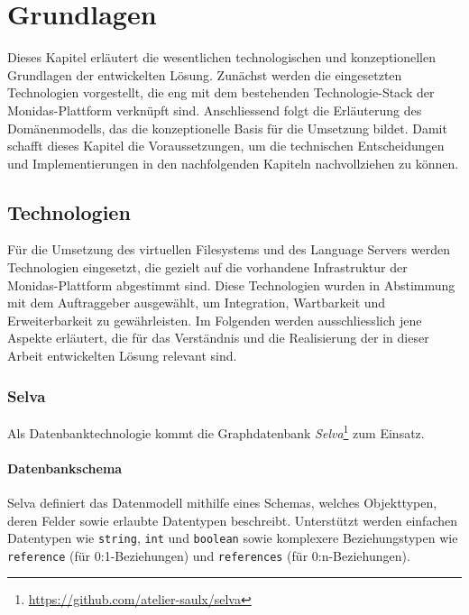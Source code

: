 \section{Grundlagen}
Dieses Kapitel erläutert die wesentlichen technologischen und konzeptionellen Grundlagen der entwickelten Lösung. Zunächst werden die eingesetzten Technologien vorgestellt, die eng mit dem bestehenden Technologie-Stack der Monidas-Plattform verknüpft sind. Anschliessend folgt die Erläuterung des Domänenmodells, das die konzeptionelle Basis für die Umsetzung bildet. Damit schafft dieses Kapitel die Voraussetzungen, um die technischen Entscheidungen und Implementierungen in den nachfolgenden Kapiteln nachvollziehen zu können.

\subsection{Technologien}
Für die Umsetzung des virtuellen Filesystems und des Language Servers werden Technologien eingesetzt, die gezielt auf die vorhandene Infrastruktur der Monidas-Plattform abgestimmt sind. Diese Technologien wurden in Abstimmung mit dem Auftraggeber ausgewählt, um Integration, Wartbarkeit und Erweiterbarkeit zu gewährleisten. Im Folgenden werden ausschliesslich jene Aspekte erläutert, die für das Verständnis und die Realisierung der in dieser Arbeit entwickelten Lösung relevant sind.


\subsubsection*{Selva}
Als Datenbanktechnologie kommt die Graphdatenbank \textit{Selva}\footnote{\url{https://github.com/atelier-saulx/selva}} zum Einsatz. 


\paragraph{Datenbankschema}
Selva definiert das Datenmodell mithilfe eines Schemas, welches Objekttypen, deren Felder sowie erlaubte Datentypen beschreibt. Unterstützt werden einfachen Datentypen wie \texttt{string}, \texttt{int} und \texttt{boolean} sowie komplexere Beziehungstypen wie \texttt{reference} (für 0:1-Beziehungen) und \texttt{references} (für 0:n-Beziehungen).

